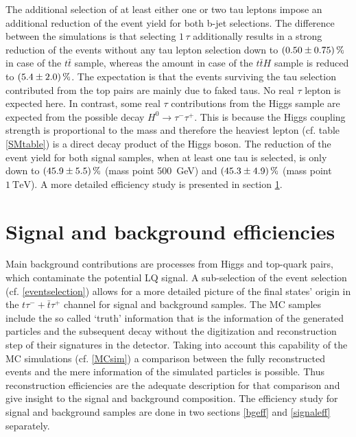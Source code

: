 %
The additional selection of at least either one or two tau leptons impose an additional reduction of the event yield for both b-jet selections. The difference between the simulations is that selecting $1\,\tau$ additionally results in a strong reduction of the events without any tau lepton selection down to $\SI{0.5\pm 0.75}{\percent}$ in case of the $t\bar{t}$ sample, whereas the amount in case of the $t\bar{t}H$ sample is reduced to $\SI{5.4\pm 2.0}{\percent}$. The expectation is that the events surviving the tau selection contributed from the top pairs are mainly due to faked taus. No real $\tau$ lepton is expected here. In contrast, some real $\tau$ contributions from the Higgs sample are expected from the possible decay $H^0\rightarrow \tau^-\tau^+$. This is because the Higgs coupling strength is proportional to the mass and therefore the heaviest lepton (cf. table \ref{SMtable}) is a direct decay product of the Higgs boson. The reduction of the event yield for both signal samples, when at least one tau is selected, is only down to $\SI{45.9\pm 5.5}{\percent}$ (mass point \SI{500}{\giga\electronvolt}) and $\SI{45.3\pm 4.9}{\percent}$ (mass point $\SI{1}{\tera\electronvolt}$). A more detailed efficiency study is presented in section \ref{signalANDbgEff}.     
\section{Signal and background efficiencies}\label{signalANDbgEff}
Main background contributions are processes from Higgs and top-quark pairs, which contaminate the potential LQ signal. A sub-selection of the event selection (cf. \ref{eventselection}) allows for a more detailed picture of the final states' origin in the $t\tau^{-}+\bar{t}\tau^{+}$ channel for signal and background samples. The MC samples include the so called `truth' information that is the information of the generated particles and the subsequent decay without the digitization and reconstruction step of their signatures in the detector. Taking into account this capability of the MC simulations (cf. \ref{MCsim}) a comparison between the fully reconstructed events and the mere information of the simulated particles is possible. Thus reconstruction efficiencies are the adequate description for that comparison and give insight to the signal and background composition. The efficiency study for signal and background samples are done in two sections \ref{bgeff} and \ref{signaleff} separately. 
